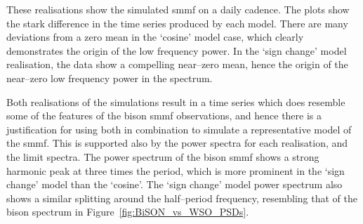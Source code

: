 These realisations show the simulated \gls{smmf} on a daily cadence. The plots show the stark difference in the time series produced by each model. There are many deviations from a zero mean in the `cosine' model case, which clearly demonstrates the origin of the low frequency power. In the `sign change' model realisation, the data show a compelling near--zero mean, hence the origin of the near--zero low frequency power in the spectrum.

Both realisations of the simulations result in a time series which does resemble some of the features of the \gls{bison} \gls{smmf} observations, and hence there is a justification for using both in combination to simulate a representative model of the \gls{smmf}. This is supported also by the power spectra for each realisation, and the limit spectra. The power spectrum of the \gls{bison} \gls{smmf} shows a strong harmonic peak at three times the period, which is more prominent in the `sign change' model than the `cosine'. The `sign change' model power spectrum also shows a similar splitting around the half--period frequency, resembling that of the \gls{bison} spectrum in Figure~\ref{fig:BiSON_vs_WSO_PSDs}.
